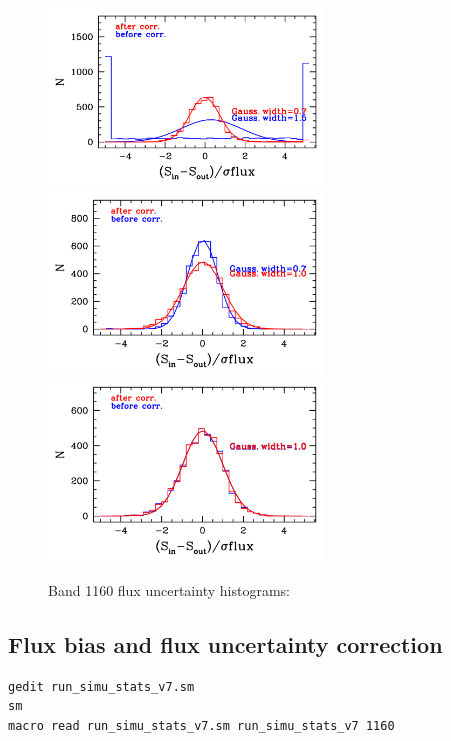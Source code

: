\documentclass[11pt,a4paper]{article}
\begin{document}
\begin{figure}[H]
	\caption{
		Band 1160 flux uncertainty histograms:
	}
	\includegraphics[width=0.65\textwidth]{galsim_1160_hist_dfcorr_1}
	\includegraphics[width=0.65\textwidth]{galsim_1160_hist_dfcorr_2}
	\includegraphics[width=0.65\textwidth]{galsim_1160_hist_dfcorr_3}
\end{figure}


\subsection{Flux bias and flux uncertainty correction}
\label{Band1160_dfcorr}

\begin{lstlisting}[language=bash]
gedit run_simu_stats_v7.sm
sm
macro read run_simu_stats_v7.sm run_simu_stats_v7 1160
\end{lstlisting}
\end{document}
